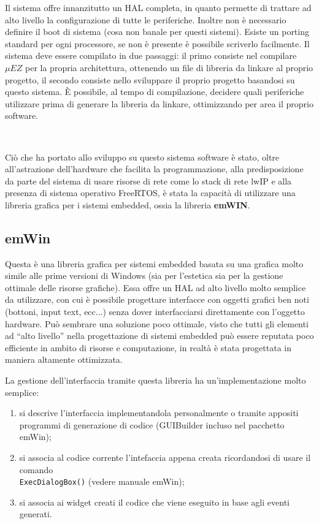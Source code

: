 \documentclass[a4paper,titlepage]{book}
\begin{document}
Il sistema offre innanzitutto un HAL completa, in quanto permette di trattare ad alto livello la configurazione di tutte le periferiche. Inoltre non è necessario definire il boot di sistema (cosa non banale per questi sistemi). Esiste un porting standard per ogni processore, se non è presente è possibile scriverlo facilmente. Il sistema deve essere compilato in due passaggi: il primo consiste nel compilare $\mu EZ$ per la propria architettura, ottenendo un file di libreria da linkare al proprio progetto, il secondo consiste nello sviluppare il proprio progetto basandosi su questo sistema. È possibile, al tempo di compilazione, decidere quali periferiche utilizzare prima di generare la libreria da linkare, ottimizzando per area il proprio software.

~

Ciò che ha portato allo sviluppo su questo sistema software è stato, oltre all'astrazione dell'hardware che facilita la programmazione, alla predisposizione da parte del sistema di usare risorse di rete come lo stack di rete lwIP e alla presenza di sistema operativo FreeRTOS, è stata la capacità di utilizzare una libreria grafica per i sistemi embedded, ossia la libreria \textbf{emWIN}.

\subsection{emWin}

Questa è una libreria grafica per sistemi embedded basata su una grafica molto simile alle prime versioni di Windows (sia per l'estetica sia per la gestione ottimale delle risorse grafiche). Essa offre un HAL ad alto livello molto semplice da utilizzare, con cui è possibile progettare interfacce con oggetti grafici ben noti (bottoni, input text, ecc...) senza dover interfacciarsi direttamente con l'oggetto hardware. Può sembrare una soluzione poco ottimale, visto che tutti gli elementi ad ``alto livello'' nella progettazione di sistemi embedded può essere reputata poco efficiente in ambito di risorse e computazione, in realtà è stata progettata in maniera altamente ottimizzata.

La gestione dell'interfaccia tramite questa libreria ha un'implementazione molto semplice:

\begin{enumerate}[noitemsep,topsep=18pt,parsep=10pt,partopsep=0pt]
\item si descrive l'interfaccia implementandola personalmente o tramite appositi programmi di generazione di codice (GUIBuilder incluso nel pacchetto emWin);
\item si associa al codice corrente l'intefaccia appena creata ricordandosi di usare il comando \\\lstinline!ExecDialogBox()! (vedere manuale emWin);
\item si associa ai widget creati il codice che viene eseguito in base agli eventi generati.

\end{enumerate}
\end{document}
